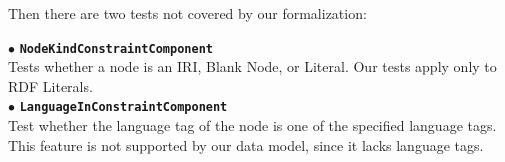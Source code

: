 \smallskip 

Then there are two tests not covered by our formalization:

\smallskip

\noindent
$\bullet$ {\bf\texttt{NodeKindConstraintComponent}} \\
Tests whether a node is an IRI, Blank Node, or Literal. Our tests apply only to RDF Literals.\\
\noindent
$\bullet$ {\bf\texttt{LanguageInConstraintComponent}} \\
 Test whether the language tag of the node is one of the specified language tags. This feature is not supported by our data model, since it lacks language tags.










